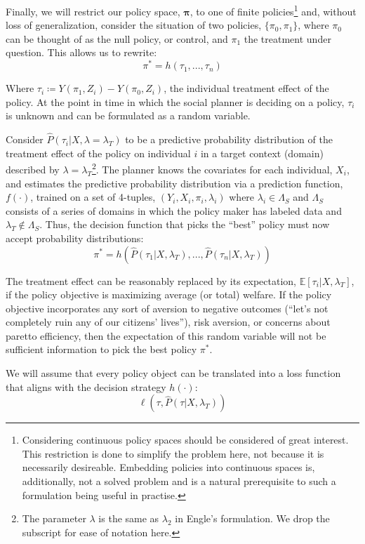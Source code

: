 \documentclass[a4paper,12pt]{article}
\begin{document}
Finally, we will restrict our policy space, $\bm{\pi}$, to one of finite policies\footnote{Considering continuous policy spaces should be considered of great interest. This restriction is done to simplify the problem here, not because it is necessarily desireable. Embedding policies into continuous spaces is, additionally, not a solved problem and is a natural prerequisite to such a formulation being useful in practise.} and, without loss of generalization, consider the situation of two policies, $\{\pi_0, \pi_1\}$, where $\pi_0$ can be thought of as the null policy, or control, and $\pi_1$ the treatment under question. This allows us to rewrite:
%
$$
\pi^* = h(\tau_1,...,\tau_n)
$$

Where $\tau_i \coloneqq Y(\pi_1, Z_{i}) - Y(\pi_0, Z_{i})$, the individual treatment effect of the policy. At the point in time in which the social planner is deciding on a policy, $\tau_i$ is unknown and can be formulated as a random variable. 

Consider $\hat{P}(\tau_i | X, \lambda = \lambda_T)$ to be a predictive probability distribution of the treatment effect of the policy on individual $i$ in a target context (domain) described by $\lambda = \lambda_T$\footnote{The parameter $\lambda$ is the same as $\lambda_2$ in Engle's formulation. We drop the subscript for ease of notation here.}. The planner knows the covariates for each individual, $X_i$, and estimates the predictive probability distribution via a prediction function, $f(\cdot)$, trained on a set of 4-tuples, $(Y_i, X_i, \pi_i, \lambda_i)$ where $\lambda_i \in \Lambda_S$ and $\Lambda_S$ consists of a series of domains in which the policy maker has labeled data and $\lambda_T \not \in \Lambda_S$. Thus, the decision function that picks the ``best'' policy must now accept probability distributions: 
%
$$
\pi^* = h(\hat{P}(\tau_1 | X, \lambda_T),...,\hat{P}(\tau_n | X, \lambda_T))
$$

The treatment effect can be reasonably replaced by its expectation, $ \mathbb{E} [ \tau_i | X, \lambda_T ] $, if the policy objective is maximizing average (or total) welfare. If the policy objective incorporates any sort of aversion to negative outcomes (``let's not completely ruin any of our citizens' lives''), risk aversion, or concerns about paretto efficiency, then the expectation of this random variable will not be sufficient information to pick the best policy $\pi^*$.

We will assume that every policy object can be translated into a loss function that aligns with the decision strategy $h(\cdot)$:
%
$$
\ell(\tau, \hat{P}(\tau | X, \lambda_T))
$$
\end{document}
